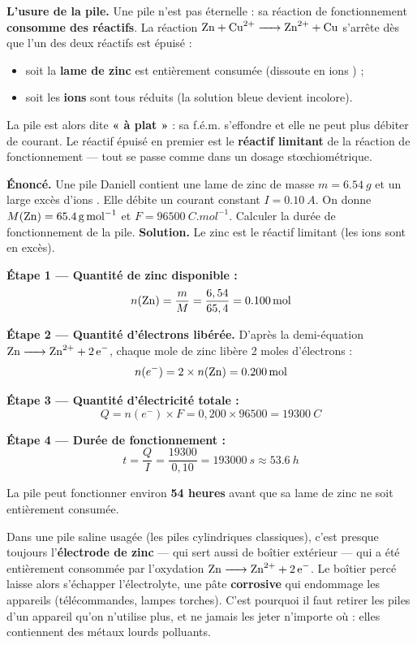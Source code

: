\documentclass[11pt]{article}
\begin{document}
\textbf{L'usure de la pile.} Une pile n'est pas éternelle : sa réaction de fonctionnement \textbf{consomme des réactifs}. La réaction $\ce{Zn + Cu^2+ -> Zn^2+ + Cu}$ s'arrête dès que l'un des deux réactifs est épuisé :

\begin{itemize}
\item soit la \textbf{lame de zinc} est entièrement consumée (dissoute en ions ) ;
\item soit les \textbf{ions } sont tous réduits (la solution bleue devient incolore).
\end{itemize}

La pile est alors dite \textbf{« à plat »} : sa f.é.m. s'effondre et elle ne peut plus débiter de courant. Le réactif épuisé en premier est le \textbf{réactif limitant} de la réaction de fonctionnement — tout se passe comme dans un dosage stœchiométrique.

\begin{exoresolu}
\textbf{Énoncé.} Une pile Daniell contient une lame de zinc de masse $m = \SI{6,54}{g}$ et un large excès d'ions . Elle débite un courant constant $I = \SI{0,10}{A}$. On donne $M(\ce{Zn}) = \SI{65,4}{g.mol^{-1}}$ et $F = \SI{96500}{C.mol^{-1}}$. Calculer la durée de fonctionnement de la pile.
\tcblower
\textbf{Solution.} Le zinc est le réactif limitant (les ions  sont en excès).

\textbf{Étape 1 — Quantité de zinc disponible :}
\[ n(\ce{Zn}) = \frac{m}{M} = \frac{6,54}{65,4} = \SI{0,100}{mol} \]

\textbf{Étape 2 — Quantité d'électrons libérée.} D'après la demi-équation $\ce{Zn -> Zn^2+ + 2 e-}$, chaque mole de zinc libère 2 moles d'électrons :
\[ n(e^-) = 2 \times n(\ce{Zn}) = \SI{0,200}{mol} \]

\textbf{Étape 3 — Quantité d'électricité totale :}
\[ Q = n(e^-) \times F = 0,200 \times 96500 = \SI{19300}{C} \]

\textbf{Étape 4 — Durée de fonctionnement :}
\[ t = \frac{Q}{I} = \frac{19300}{0,10} = \SI{193000}{s} \approx \SI{53,6}{h} \]

La pile peut fonctionner environ \textbf{54 heures} avant que sa lame de zinc ne soit entièrement consumée.
\end{exoresolu}

\begin{savaistu}
Dans une pile saline usagée (les piles cylindriques classiques), c'est presque toujours l'\textbf{électrode de zinc} — qui sert aussi de boîtier extérieur — qui a été entièrement consommée par l'oxydation $\ce{Zn -> Zn^2+ + 2 e-}$. Le boîtier percé laisse alors s'échapper l'électrolyte, une pâte \textbf{corrosive} qui endommage les appareils (télécommandes, lampes torches). C'est pourquoi il faut retirer les piles d'un appareil qu'on n'utilise plus, et ne jamais les jeter n'importe où : elles contiennent des métaux lourds polluants.
\end{savaistu}
\end{document}
